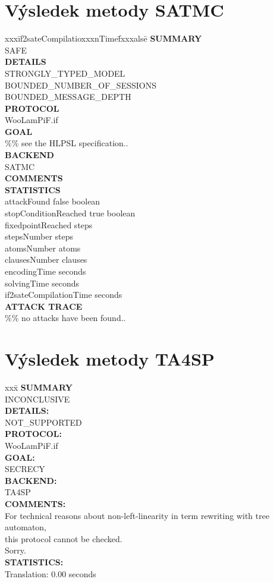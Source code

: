 \documentclass[11pt,a4paper]{article}
\begin{document}
\section{Výsledek metody SATMC}
\begin{tabbing}
xxx\=if2sateCompilatioxxxnTime\=fxxxalse\=\kill
\textbf{SUMMARY}\\
\>  SAFE\\
\textbf{DETAILS}\\
\>  STRONGLY\_TYPED\_MODEL\\
\>  BOUNDED\_NUMBER\_OF\_SESSIONS\\
\>  BOUNDED\_MESSAGE\_DEPTH\\
\textbf{PROTOCOL}\\
\>  WooLamPiF.if\\
\textbf{GOAL}\\
\>  \%\% see the HLPSL specification..\\
\textbf{BACKEND}\\
\>  SATMC\\
\textbf{COMMENTS}\\
\textbf{STATISTICS}\\
\>  attackFound  \>  false \>  boolean\\
\>  stopConditionReached  \> true \> boolean\\
\>  fixedpointReached  \>  steps\\
\>  stepsNumber   \>  steps\\
\>  atomsNumber  \>  atoms\\
\>  clausesNumber    \> clauses\\
\>  encodingTime   \> seconds\\
\>  solvingTime    \> seconds\\
\>  if2sateCompilationTime \> seconds\\
\textbf{ATTACK TRACE}\\
\>  \%\% no attacks have been found..
\end{tabbing}

\section{Výsledek metody TA4SP}
\begin{tabbing}
xxx\=\kill
\textbf{SUMMARY}\\
\> INCONCLUSIVE\\
\textbf{DETAILS:}\\
\> NOT\_SUPPORTED\\
\textbf{PROTOCOL:}\\
\> WooLamPiF.if\\
\textbf{GOAL:}\\
\> SECRECY\\
\textbf{BACKEND:}\\
\> TA4SP\\
\textbf{COMMENTS:}\\
\> For technical reasons about non-left-linearity in term rewriting with tree automaton,\\
\> this protocol cannot be checked.\\
\> Sorry.\\
\textbf{STATISTICS:}\\
\> Translation: 0.00 seconds
\end{tabbing}
\end{document}

